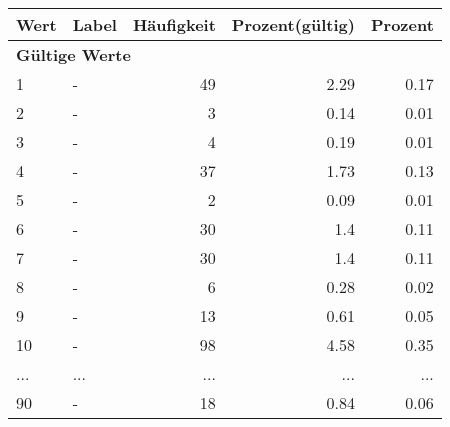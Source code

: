      \begin{longtable}{lXrrr}
     \toprule
     \textbf{Wert} & \textbf{Label} & \textbf{Häufigkeit} & \textbf{Prozent(gültig)} & \textbf{Prozent} \\
     \endhead
     \midrule
     \multicolumn{5}{l}{\textbf{Gültige Werte}}\\
        1 & \multicolumn{1}{X}{-} & %
          \num{49} &
          \num[round-mode=places,round-precision=2]{2,29} &
          \num[round-mode=places,round-precision=2]{0,17} \\
        2 & \multicolumn{1}{X}{-} & %
          \num{3} &
          \num[round-mode=places,round-precision=2]{0,14} &
          \num[round-mode=places,round-precision=2]{0,01} \\
        3 & \multicolumn{1}{X}{-} & %
          \num{4} &
          \num[round-mode=places,round-precision=2]{0,19} &
          \num[round-mode=places,round-precision=2]{0,01} \\
        4 & \multicolumn{1}{X}{-} & %
          \num{37} &
          \num[round-mode=places,round-precision=2]{1,73} &
          \num[round-mode=places,round-precision=2]{0,13} \\
        5 & \multicolumn{1}{X}{-} & %
          \num{2} &
          \num[round-mode=places,round-precision=2]{0,09} &
          \num[round-mode=places,round-precision=2]{0,01} \\
        6 & \multicolumn{1}{X}{-} & %
          \num{30} &
          \num[round-mode=places,round-precision=2]{1,4} &
          \num[round-mode=places,round-precision=2]{0,11} \\
        7 & \multicolumn{1}{X}{-} & %
          \num{30} &
          \num[round-mode=places,round-precision=2]{1,4} &
          \num[round-mode=places,round-precision=2]{0,11} \\
        8 & \multicolumn{1}{X}{-} & %
          \num{6} &
          \num[round-mode=places,round-precision=2]{0,28} &
          \num[round-mode=places,round-precision=2]{0,02} \\
        9 & \multicolumn{1}{X}{-} & %
          \num{13} &
          \num[round-mode=places,round-precision=2]{0,61} &
          \num[round-mode=places,round-precision=2]{0,05} \\
        10 & \multicolumn{1}{X}{-} & %
          \num{98} &
          \num[round-mode=places,round-precision=2]{4,58} &
          \num[round-mode=places,round-precision=2]{0,35} \\
       ... & ... & ... & ... & ... \\
        90 & \multicolumn{1}{X}{-} & %
          \num{18} &
          \num[round-mode=places,round-precision=2]{0,84} &
          \num[round-mode=places,round-precision=2]{0,06} \\


\end{longtable}
